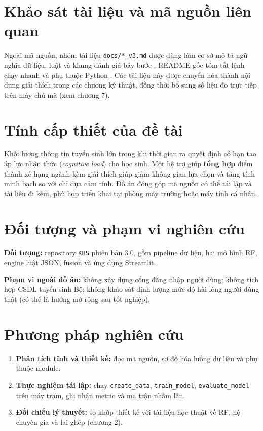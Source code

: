 \section{Khảo sát tài liệu và mã nguồn liên quan}
Ngoài mã nguồn, nhóm tài liệu \texttt{docs/*\_v3.md} được dùng làm cơ sở mô tả ngữ nghĩa dữ liệu, luật và khung đánh giá bảy bước \cite{docs_hybrid}. README gốc tóm tắt lệnh chạy nhanh và phụ thuộc Python \cite{docs_dataset}. Các tài liệu này được chuyển hóa thành nội dung giải thích trong các chương kỹ thuật, đồng thời bổ sung số liệu đo trực tiếp trên máy chủ mã (xem chương 7).

\section{Tính cấp thiết của đề tài}
Khối lượng thông tin tuyển sinh lớn trong khi thời gian ra quyết định có hạn tạo áp lực nhận thức (\textit{cognitive load}) cho học sinh. Một hệ trợ giúp \textbf{tổng hợp} điểm thành xế hạng ngành kèm giải thích giúp giảm không gian lựa chọn và tăng tính minh bạch so với chỉ dựa cảm tính. Đồ án đóng góp mã nguồn có thể tái lập và tài liệu đi kèm, phù hợp triển khai tại phòng máy trường hoặc máy tính cá nhân.

\section{Đối tượng và phạm vi nghiên cứu}
\textbf{Đối tượng:} repository \texttt{KBS} phiên bản 3.0, gồm pipeline dữ liệu, hai mô hình RF, engine luật JSON, fusion và ứng dụng Streamlit.

\textbf{Phạm vi ngoài đồ án:} không xây dựng cổng đăng nhập người dùng; không tích hợp CSDL tuyển sinh Bộ; không khảo sát định lượng mức độ hài lòng người dùng thật (có thể là hướng mở rộng sau tốt nghiệp).

\section{Phương pháp nghiên cứu}
\begin{enumerate}[leftmargin=*]
  \item \textbf{Phân tích tĩnh và thiết kế:} đọc mã nguồn, sơ đồ hóa luồng dữ liệu và phụ thuộc module.
  \item \textbf{Thực nghiệm tái lập:} chạy \texttt{create\_data}, \texttt{train\_model}, \texttt{evaluate\_model} trên máy trạm, ghi nhận metric và ma trận nhầm lẫn.
  \item \textbf{Đối chiếu lý thuyết:} so khớp thiết kế với tài liệu học thuật về RF, hệ chuyên gia và lai ghép (chương 2).
\end{enumerate}

